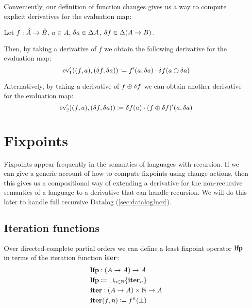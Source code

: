 Conveniently, our definition of function changes gives us a way to compute explicit derivatives for
the evaluation map:
\begin{prop}
\label{prop:evDerivatives}
  Let
  $f: \hat{A} \rightarrow \hat{B}$,
  $a \in A$, $\delta a \in \Delta A$,
  $\delta f \in \Delta (A \rightarrow B)$.

  Then, by taking a derivative of $f$ we obtain the following derivative for the evaluation map:
  \begin{displaymath}
    \operatorname{ev}'_1((f, a), (\delta f, \delta a)) \coloneqq f'(a, \delta a) \cdot \delta f(a \oplus \delta a)
  \end{displaymath}

  Alternatively, by taking a derivative of $f \oplus \delta f$ we can obtain another derivative
  for the evaluation map:
  \begin{displaymath}
    \operatorname{ev}'_2((f, a), (\delta f, \delta a)) \coloneqq \delta f(a) \cdot (f \oplus \delta f)'(a, \delta a)
  \end{displaymath}
\end{prop}

\section{Fixpoints}
\label{sec:fixpoints}

Fixpoints appear frequently in the semantics of languages with recursion. If we
can give a generic account of how to compute fixpoints using change actions,
then this gives us a compositional way of extending a derivative for the
non-recursive semantics of a language to a derivative that can handle recursion.
We will do this later to handle full recursive Datalog (\cref{sec:datalogIncr}).

\subsection{Iteration functions}

Over directed-complete partial orders we can define a least fixpoint operator $\mathbf{lfp}$ in terms of the
iteration function $\mathbf{iter}$:
\begin{align*}
  &\mathbf{lfp} : (A \rightarrow A) \rightarrow A\\
  &\mathbf{lfp} \coloneqq \sqcup_{n \in \mathbb{N}} \{ \mathbf{iter}_n \}\\
  &\mathbf{iter} : (A \rightarrow A) \times \mathbb{N} \rightarrow A\\
  &\mathbf{iter}(f, n) \coloneqq f^n(\bot)
\end{align*}

